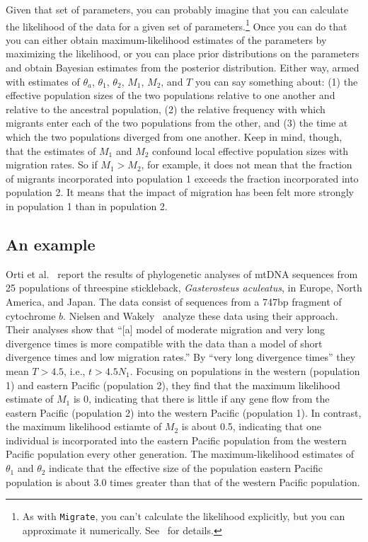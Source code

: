 \documentclass[12pt]{article}
\begin{document}
Given that set of parameters, you can probably imagine that you can
calculate the likelihood of the data for a given set of
parameters.\footnote{As with {\tt Migrate}, you can't calculate the
  likelihood explicitly, but you can approximate it
  numerically. See~\cite{Nielsen-Wakeley-2001} for details.} Once you
can do that you can either obtain maximum-likelihood estimates of the
parameters by maximizing the likelihood, or you can place prior
distributions on the parameters and obtain Bayesian estimates from the
posterior distribution. Either way, armed with estimates of
$\theta_a$, $\theta_1$, $\theta_2$, $M_1$, $M_2$, and $T$ you can say
something about: (1) the effective population sizes of the two
populations relative to one another and relative to the ancestral
population, (2) the relative frequency with which migrants enter each
of the two populations from the other, and (3) the time at which the
two populations diverged from one another. Keep in mind, though, that
the estimates of $M_1$ and $M_2$ confound local effective population
sizes with migration rates. So if $M_1 > M_2$, for example, it does
not mean that the fraction of migrants incorporated into population 1
exceeds the fraction incorporated into population 2. It means that the
impact of migration has been felt more strongly in population 1 than
in population 2.

\subsection*{An example}

Orti et al.~\cite{Orti-etal-1994} report the results of phylogenetic
analyses of mtDNA sequences from 25 populations of threespine
stickleback, {\it Gasterosteus aculeatus}, in Europe, North America,
and Japan. The data consist of sequences from a 747bp fragment of
cytochrome $b$. Nielsen and Wakely~\cite{Nielsen-Wakeley-2001} analyze
these data using their approach. Their analyses show that ``[a] model
of moderate migration and very long divergence times is more
compatible with the data than a model of short divergence times and
low migration rates.'' By ``very long divergence times'' they mean $T
> 4.5$, i.e., $t > 4.5N_1$. Focusing on populations in the western
(population 1) and eastern Pacific (population 2), they find that the
maximum likelihood estimate of $M_1$ is 0, indicating that there is
little if any gene flow from the eastern Pacific (population 2) into
the western Pacific (population 1). In contrast, the maximum
likelihood estiamte of $M_2$ is about 0.5, indicating that one
individual is incorporated into the eastern Pacific population from
the western Pacific population every other generation. The
maximum-likelihood estimates of $\theta_1$ and $\theta_2$ indicate
that the effective size of the population eastern Pacific population
is about 3.0 times greater than that of the western Pacific
population.
\end{document}
